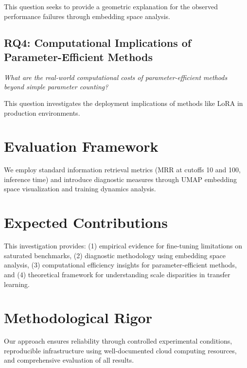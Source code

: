 This question seeks to provide a geometric explanation for the observed performance failures through embedding space analysis.

\subsection{RQ4: Computational Implications of Parameter-Efficient Methods}

\textit{What are the real-world computational costs of parameter-efficient methods beyond simple parameter counting?}

This question investigates the deployment implications of methods like LoRA in production environments.

\section{Evaluation Framework}

We employ standard information retrieval metrics (MRR at cutoffs 10 and 100, inference time) and introduce diagnostic measures through UMAP embedding space visualization and training dynamics analysis.

\section{Expected Contributions}

This investigation provides: (1) empirical evidence for fine-tuning limitations on saturated benchmarks, (2) diagnostic methodology using embedding space analysis, (3) computational efficiency insights for parameter-efficient methods, and (4) theoretical framework for understanding scale disparities in transfer learning.

\section{Methodological Rigor}

Our approach ensures reliability through controlled experimental conditions, reproducible infrastructure using well-documented cloud computing resources, and comprehensive evaluation of all results.
